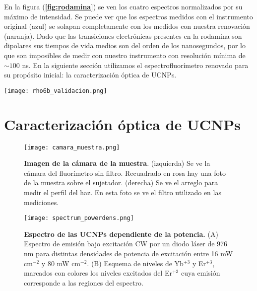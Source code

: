 En la figura (\textbf{\ref{fig:rodamina}}) se ven los cuatro espectros normalizados por su máximo de intensidad.
Se puede ver que los espectros medidos con el instrumento original (azul) se solapan completamente con los medidos con nuestra renovación (naranja).
Dado que las transiciones electrónicas presentes en la rodamina son dipolares sus tiempos de vida medios son del orden de los nanosegundos, por lo que son imposibles de medir con nuestro instrumento con resolución mínima de $\sim 100$ ns.
En la siguiente sección utilizamos el espectrofluorímetro renovado para su propósito inicial: la caracterización óptica de UCNPs.

\begin{SCfigure}
    \centering
    \texttt{[image: rho6b\_validacion.png]}
    \caption{\textbf{Espectros de la rodamina B}, tanto de excitación (punteado) como de emisión (sólido). Ambos fueron medidos con el \textit{software} y \textit{hardware} original (azul) como con el renovado (naranja).}
    \label{fig:rodamina}
\end{SCfigure}

\section{Caracterización óptica de UCNPs}

\begin{figure}
    \centering
    \texttt{[image: camara\_muestra.png]}
    \caption{\textbf{Imagen de la cámara de la muestra}. (izquierda) Se ve la cámara del fluorímetro sin filtro. Recuadrado en rosa hay una foto de la muestra sobre el sujetador. (derecha) Se ve el arreglo para medir el perfil del haz. En esta foto se ve el filtro utilizado en las mediciones.}
    \label{fig:camara_muestra}
\end{figure}

\begin{figure}
    \centering
    \texttt{[image: spectrum\_powerdens.png]}
    \caption{\textbf{Espectro de las UCNPs dependiente de la potencia.} (A) Espectro de emisión bajo excitación CW por un diodo láser de 976 nm para distintas densidades de potencia de excitación entre 16 mW cm$^{-2}$ y 80 mW cm$^{-2}$.
    (B) Esquema de niveles de Yb$^{+3}$ y Er$^{+3}$, marcados con colores los niveles excitados del Er$^{+3}$ cuya emisión corresponde a las regiones del espectro.}
    \label{fig:power_dep_spectrum}
\end{figure}

